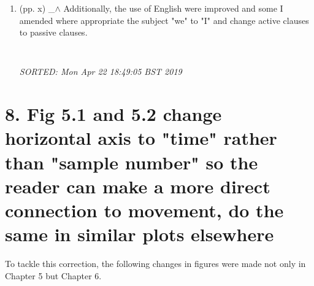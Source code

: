 \documentclass[12pt]{article}
\begin{document}
\begin{enumerate}
\item  (pp. x)  \_$\wedge$  
	Additionally, the use of English were improved 
	and some I amended where appropriate the subject "we" to "I" 
	and change active clauses to passive clauses.
	\begin{verbatim}
	
	\end{verbatim}
	\textit{
	SORTED:  Mon Apr 22 18:49:05 BST 2019
	}
	\\

%
%	
%
%



\end{enumerate}














\section*{8. 
Fig 5.1 and 5.2 change horizontal axis to
"time" rather than "sample number" so the reader
can make a more direct connection to movement,
do the same in similar plots elsewhere
}

To tackle this correction, the following changes 
in figures were made not only in Chapter 5 but Chapter 6.
\end{document}
